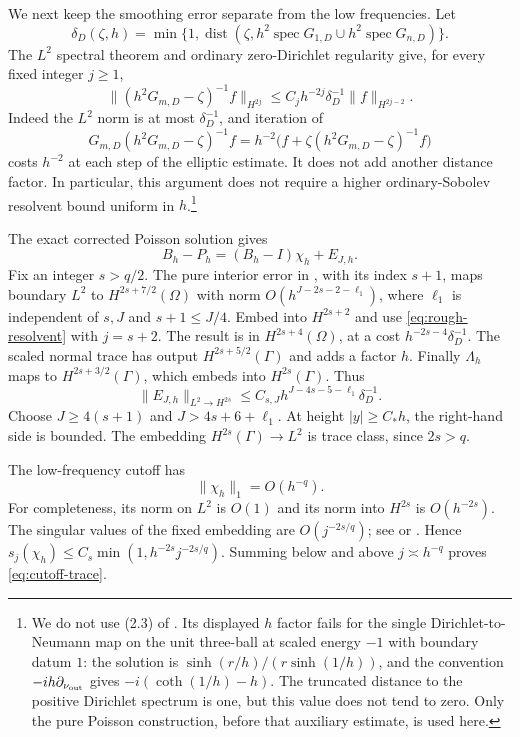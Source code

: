 \documentclass[11pt,a4paper]{article}
\DeclareMathOperator{\spec}{spec}
\theoremstyle{remark}
\numberwithin{equation}{section}
\begin{document}
We next keep the smoothing error separate from the low frequencies.
Let
\[
 \delta_D(\zeta,h)=\min\{1,\operatorname{dist}
 (\zeta,h^2\spec G_{1,D}\cup h^2\spec G_{n,D})\}.
\]
The $L^2$ spectral theorem and ordinary zero-Dirichlet regularity give,
for every fixed integer $j\ge1$,
\begin{equation}\label{eq:rough-resolvent}
 \|(h^2G_{m,D}-\zeta)^{-1}f\|_{H^{2j}}
 \le C_jh^{-2j}\delta_D^{-1}\|f\|_{H^{2j-2}}.
\end{equation}
Indeed the $L^2$ norm is at most $\delta_D^{-1}$, and iteration of
\[
 G_{m,D}(h^2G_{m,D}-\zeta)^{-1}f
 =h^{-2}\big(f+\zeta(h^2G_{m,D}-\zeta)^{-1}f\big)
\]
costs $h^{-2}$ at each step of the elliptic estimate. It does not add
another distance factor. In particular, this argument does not require
a higher ordinary-Sobolev resolvent bound uniform in $h$.\footnote{We
do not use (2.3) of \cite{PV}. Its displayed $h$ factor fails for the
single Dirichlet-to-Neumann map on the unit three-ball at scaled energy
$-1$ with boundary datum $1$: the solution is
$\sinh(r/h)/(r\sinh(1/h))$, and the convention
$-ih\partial_{\nu_{\rm out}}$ gives
$-i(\coth(1/h)-h)$. The truncated distance to the positive Dirichlet
spectrum is one, but this value does not tend to zero. Only the pure
Poisson construction, before that auxiliary estimate, is used here.}

The exact corrected Poisson solution gives
\begin{equation}\label{eq:exact-residual}
 B_h-P_h=(B_h-I)\chi_h+E_{J,h}.
\end{equation}
Fix an integer $s>q/2$. The pure interior error in
\cite[(2.13)]{PV}, with its index $s+1$, maps boundary $L^2$ to
$H^{2s+7/2}(\Omega)$ with norm
$O(h^{J-2s-2-\ell_1})$, where $\ell_1$ is independent of $s,J$ and
$s+1\le J/4$. Embed into $H^{2s+2}$ and use
\eqref{eq:rough-resolvent} with $j=s+2$. The result is in
$H^{2s+4}(\Omega)$, at a cost $h^{-2s-4}\delta_D^{-1}$.
The scaled normal trace has output $H^{2s+5/2}(\Gamma)$ and adds a
factor $h$. Finally $\Lambda_h$ maps to $H^{2s+3/2}(\Gamma)$, which
embeds into $H^{2s}(\Gamma)$. Thus
\begin{equation}\label{eq:smoothing-error}
 \|E_{J,h}\|_{L^2\to H^{2s}}
 \le C_{s,J}h^{J-4s-5-\ell_1}\delta_D^{-1}.
\end{equation}
Choose $J\ge4(s+1)$ and $J>4s+6+\ell_1$. At height $|y|\ge C_*h$,
the right-hand side is bounded. The embedding $H^{2s}(\Gamma)\to L^2$
is trace class, since $2s>q$.

The low-frequency cutoff has
\begin{equation}\label{eq:cutoff-trace}
 \|\chi_h\|_1=O(h^{-q}).
\end{equation}
For completeness, its norm on $L^2$ is $O(1)$ and its norm into
$H^{2s}$ is $O(h^{-2s})$. The singular values of the fixed embedding
are $O(j^{-2s/q})$; see \cite[(2.11)]{PV} or
\cite[Appendix~E]{EZ}. Hence
$s_j(\chi_h)\le C_s\min(1,h^{-2s}j^{-2s/q})$.
Summing below and above $j\asymp h^{-q}$ proves
\eqref{eq:cutoff-trace}.
\end{document}
